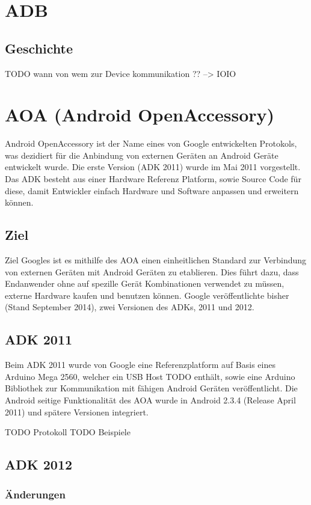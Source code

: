 \documentclass[12pt,journal,compsoc]{IEEEtran}
\begin{document}
\section{ADB}
\subsection{Geschichte}

TODO wann von wem zur Device kommunikation ?? --> IOIO


\section{AOA (Android OpenAccessory)}
Android OpenAccessory ist der Name eines von Google entwickelten Protokols, was 
dezidiert für die Anbindung von externen Geräten an Android Geräte entwickelt wurde.
Die erste Version (ADK 2011) wurde im Mai 2011 vorgestellt.
Das ADK besteht aus einer Hardware Referenz Platform, sowie Source Code für diese, damit 
Entwickler einfach Hardware und Software anpassen und erweitern können.
\cite{developaoa}
\subsection{Ziel}
Ziel Googles ist es mithilfe des AOA einen einheitlichen Standard zur Verbindung von externen Geräten mit Android Geräten zu etablieren.
Dies führt dazu, dass Endanwender ohne auf spezille Gerät Kombinationen verwendet zu müssen, externe Hardware kaufen und benutzen können.
Google veröffentlichte bisher (Stand September 2014), zwei Versionen des ADKs, 2011 und 2012. 

\subsection{ADK 2011}
Beim ADK 2011 wurde von Google eine
Referenzplatform auf Basis eines Arduino Mega 2560, welcher ein USB Host TODO enthält, sowie eine Arduino Bibliothek zur Kommunikation mit fähigen Android Geräten veröffentlicht.
Die Android seitige Funktionalität des AOA wurde in Android 2.3.4 (Release April 2011) und spätere Versionen integriert. 

TODO Protokoll
TODO Beispiele
\subsection{ADK 2012}
\subsubsection{Änderungen}
\end{document}
